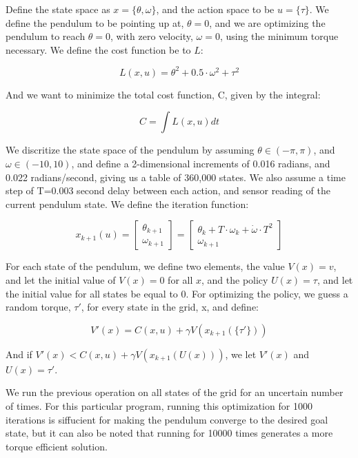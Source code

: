 \documentclass[12pt]{report}
\begin{document}
Define the state space as $x=\{\theta, \omega\}$, and the action space to be $u=\{\tau\}$. We define the pendulum to be pointing up at, $\theta = 0$, and we are optimizing the pendulum to reach $\theta = 0$, with zero velocity, $\omega = 0$, using the minimum torque necessary. We define the cost function be to $L$:

\begin{equation} 
L(x,u) = \theta^2 + 0.5 \cdot \omega^2 + \tau^2
\end{equation}

And we want to minimize the total cost function, C, given by the integral: 

\begin{equation} 
C = \int L(x,u) dt
\end{equation}

We discritize the state space of the pendulum by assuming $\theta \in  (-\pi,\pi)$, and $\omega \in (-10,10)$, and define a 2-dimensional increments of 0.016 radians, and 0.022 radians/second, giving us a table of 360,000 states. We also assume a time step of T=0.003 second delay between each action, and sensor reading of the current pendulum state. We define the iteration function:

\begin{equation} 
x_{k+1}(u) = 
\begin{bmatrix}
\theta_{k+1} \\
\omega_{k+1}
\end{bmatrix}
=
\begin{bmatrix}
\theta_{k} + T \cdot \omega_{k} + \dot{\omega} \cdot T^2 \\
\omega_{k+1}
\end{bmatrix}
\end{equation}

For each state of the pendulum, we define two elements, the value $V(x) = {v}$, and let the initial value of $V(x)=0$ for all $x$, and the policy $U(x)={\tau}$, and let the initial value for all states be equal to 0. For optimizing the policy, we guess a random torque, $\tau'$, for every state in the grid, x, and define:

\begin{equation} 
V'(x) = C(x,u) + \gamma V(x_{k+1}(\{\tau '\}))
\end{equation}

And if $V'(x)<C(x,u) + \gamma V(x_{k+1}(U(x)))$, we let $V'(x)$ and $U(x)={\tau'}$.

We run the previous operation on all states of the grid for an uncertain number of times. For this particular program, running this optimization for 1000 iterations is siffucient for making the pendulum converge to the desired goal state, but it can also be noted that running for 10000 times generates a more torque efficient solution.
\end{document}

